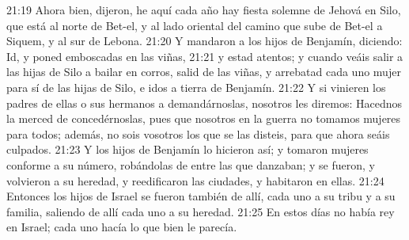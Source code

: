 21:19 Ahora bien, dijeron, he aquí cada año hay fiesta solemne de Jehová en Silo, que está al norte de Bet-el, y al lado oriental del camino que sube de Bet-el a Siquem, y al sur de Lebona.  
21:20 Y mandaron a los hijos de Benjamín, diciendo: Id, y poned emboscadas en las viñas,  
21:21 y estad atentos; y cuando veáis salir a las hijas de Silo a bailar en corros, salid de las viñas, y arrebatad cada uno mujer para sí de las hijas de Silo, e idos a tierra de Benjamín.  
21:22 Y si vinieren los padres de ellas o sus hermanos a demandárnoslas, nosotros les diremos: Hacednos la merced de concedérnoslas, pues que nosotros en la guerra no tomamos mujeres para todos; además, no sois vosotros los que se las disteis, para que ahora seáis culpados.  
21:23 Y los hijos de Benjamín lo hicieron así; y tomaron mujeres conforme a su número, robándolas de entre las que danzaban; y se fueron, y volvieron a su heredad, y reedificaron las ciudades, y habitaron en ellas.  
21:24 Entonces los hijos de Israel se fueron también de allí, cada uno a su tribu y a su familia, saliendo de allí cada uno a su heredad.  
21:25 En estos días no había rey en Israel; cada uno hacía lo que bien le parecía.
